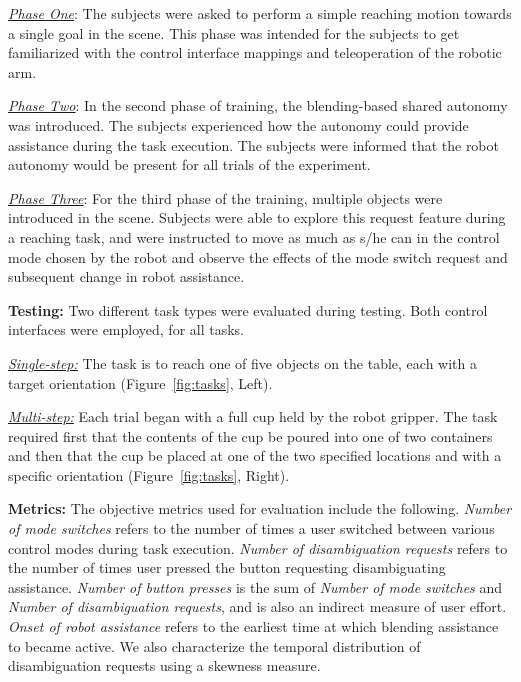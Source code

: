 \documentclass[natbib, twocolumn]{svjour3}          %
\begin{document}
\noindent\underline{\textit{Phase One}}: The subjects were asked to perform a simple reaching motion towards a single goal in the scene. This phase was intended for the subjects to get familiarized with the control interface mappings and teleoperation of the robotic arm. 

\noindent\underline{\textit{Phase Two}}: In the second phase of training, the blending-based shared autonomy was introduced. The subjects experienced how the autonomy could provide assistance during the task execution. The subjects were informed that the robot autonomy would be present for all trials of the experiment. 

\noindent\underline{\textit{Phase Three}}: For the third phase of the training, multiple objects were introduced in the scene. 
Subjects were able to explore this request feature during a reaching task, and were instructed to move as much as s/he can in the control mode chosen by the robot and observe the effects of the mode switch request and subsequent change in robot assistance. 

\noindent\textbf{Testing:} Two different task types were evaluated during testing. Both control interfaces were employed, for all tasks.

\noindent\underline{\textit{Single-step:}} The task is to reach one of five objects on the table, each with a target orientation (Figure~\ref{fig:tasks}, Left). 

\noindent\underline{\textit{Multi-step:}} Each trial began with a full cup held by the robot gripper. The task required first that the contents of the cup be poured into one of two containers and then that the cup be placed at one of the two specified locations and with a specific orientation (Figure~\ref{fig:tasks}, Right). 


\noindent\textbf{Metrics:}
The objective metrics used for evaluation include the following. \textit{Number of mode switches} refers to the number of times a user switched between various control modes during task execution. \textit{Number of disambiguation requests} refers to the number of times user pressed the button requesting disambiguating assistance. \textit{Number of button presses} is the sum of \textit{Number of mode switches} and \textit{Number of disambiguation requests}, and is also an indirect measure of user effort. \textit{Onset of robot assistance} refers to the earliest time at which blending assistance to became active. We also characterize the temporal distribution of disambiguation requests using a skewness measure. 
\end{document}
